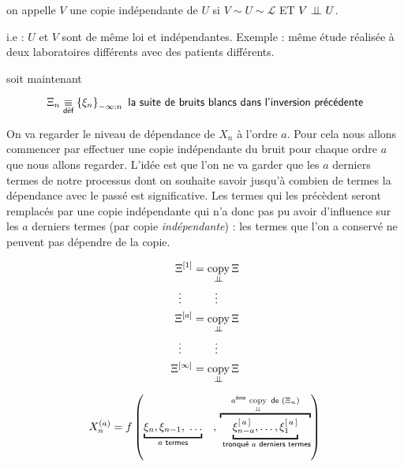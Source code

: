 \begin{definition}
	on appelle $V$ une copie indépendante de $U$ si $V \sim U \sim \mathcal L$ ET $V \perp \!\!\! \perp U$.

	i.e : $U$ et $V$ sont de même loi et indépendantes. Exemple : même étude réalisée à deux laboratoires différents avec des patients différents.
\end{definition}

soit maintenant

$$\Xi_n \underset {\textsf{déf}} {\equiv} \left\{ \xi_n\right\}_{-\infty : n} \textsf{ la suite de bruits blancs dans l'inversion précédente}$$

On va regarder le niveau de dépendance de $X_n$ à l'ordre $a$. Pour cela nous allons commencer par effectuer une copie indépendante du bruit pour chaque ordre $a$ que nous allons regarder. L'idée est que l'on ne va garder que les $a$ derniers termes de notre processus dont on souhaite savoir jusqu'à combien de termes la dépendance avec le passé est significative. Les termes qui les précèdent seront remplacés par une copie indépendante qui n'a donc pas pu avoir d'influence sur les $a$ derniers termes (par copie \emph{indépendante}) : les termes que l'on a conservé ne peuvent pas dépendre de la copie.


\begin{minipage}{0.45\textwidth}

	\begin{align*}
		\Xi^{[1]}      & = \operatornamewithlimits{copy}\limits_{\indep} \Xi
		\\
		\vdots\quad    & \quad\quad \vdots
		\\
		\Xi^{[a]}      & = \operatornamewithlimits{copy}\limits_{\indep} \Xi
		\\ \vdots\quad &  \quad\quad \vdots
		\\
		\Xi^{[\infty]} & = \operatornamewithlimits{copy}\limits_{\indep} \Xi
	\end{align*}

\end{minipage}
%
\begin{minipage}{0.45\textwidth}
	$$X_n^{(a)} = f\left(
		\underbracket{
			\xi_n, \xi_{n-1}, \; \dots}_
		{a \textsf{ termes}}
		\quad , \,
		\overbracket
		{\underbracket{\xi_{n-a}^{[\, a \, ]} , \dots , \xi_{1}^{[ \, a \, ]}}_
			{\textsf{ tronqué } a \textsf{ derniers termes}}
		}^{a^{\textsf{ème}} \, \operatornamewithlimits{copy}\limits_{\indep} \textsf{ de } (\Xi_n)}
		\right)$$
\end{minipage}

